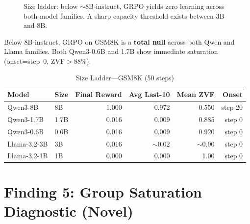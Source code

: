 \documentclass[12pt,a4paper]{report}
\theoremstyle{definition}
\begin{document}
\begin{figure}[htbp]
\centering
{}
\caption{Size ladder: below $\sim$8B-instruct, GRPO yields zero learning across both model families.
A sharp capacity threshold exists between 3B and 8B.}
\label{fig:size-ladder}
\end{figure}


Below 8B-instruct, GRPO on GSM8K is a \textbf{total null} across both Qwen and Llama families.
Both Qwen3-0.6B and 1.7B show immediate saturation (onset=step~0, ZVF$>$88\%).

\begin{table}[htbp]
\centering
\caption{Size Ladder---GSM8K (50 steps)}
\label{tab:size-ladder}
\begin{tabular}{llrrrr}
\toprule
\textbf{Model} & \textbf{Size} & \textbf{Final Reward} & \textbf{Avg Last-10} & \textbf{Mean ZVF} & \textbf{Onset} \\
\midrule
Qwen3-8B & 8B & 1.000 & 0.972 & 0.550 & step 20 \\
Qwen3-1.7B & 1.7B & 0.016 & 0.009 & 0.885 & step 0 \\
Qwen3-0.6B & 0.6B & 0.016 & 0.009 & 0.920 & step 0 \\
Llama-3.2-3B & 3B & 0.016 & $\sim$0.02 & $\sim$0.90 & step 0 \\
Llama-3.2-1B & 1B & 0.000 & 0.000 & 1.00 & step 0 \\
\bottomrule
\end{tabular}
\end{table}

\section{Finding 5: Group Saturation Diagnostic (Novel)}
\end{document}
